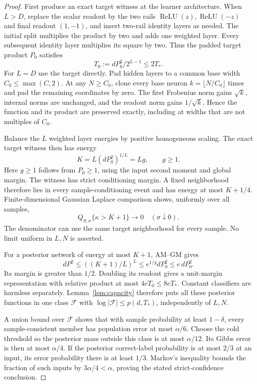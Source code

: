 \documentclass[11pt]{article}
\theoremstyle{remark}\newtheorem{remark}[theorem]{Remark}
\newcommand{\relu}{\operatorname{ReLU}}
\begin{document}
\begin{proof}
First produce an exact target witness at the learner architecture.
When $L>D$, replace the scalar readout by the two rails
$\relu(z),\relu(-z)$ and final readout $(1,-1)$, and insert two-rail
identity layers as needed. The initial split multiplies the product by
two and adds one weighted layer. Every subsequent identity layer
multiplies its square by two. Thus the padded target product $P_0$
satisfies
\[
 T_0:=dP_0^2/2^{L-1}\le2T_*.
\]
For $L=D$ use the target directly. Pad hidden layers to a common base
width $C_0\le\max(C,2)$. At any $N\ge C_0$, clone every base neuron
$k=\lfloor N/C_0\rfloor$ times and pad the remaining coordinates by zero.
The first Frobenius norm gains $\sqrt k$, internal norms are unchanged,
and the readout norm gains $1/\sqrt k$. Hence the function and its product
are preserved exactly, including at widths that are not multiples of
$C_0$.

Balance the $L$ weighted layer energies by positive homogeneous scaling.
The exact target witness then has energy
\[
 K=L(dP_0^2)^{1/L}=L g,\qquad g\ge1.
\]
Here $g\ge1$ follows from $P_0\ge1$, using the input second moment and
global margin. The witness has strict conditioning margin. A fixed
neighborhood therefore lies in every sample-conditioning event and has
energy at most $K+1/4$. Finite-dimensional Gaussian Laplace comparison
shows, uniformly over all samples,
\[
 Q_{S,\sigma}\{\kappa>K+1\}\longrightarrow0
                  \quad(\sigma\downarrow0).
\]
The denominator can use the same target neighborhood for every sample.
No limit uniform in $L,N$ is asserted.

For a posterior network of energy at most $K+1$, AM--GM gives
\[
 dP^2\le((K+1)/L)^L\le e^{1/g}dP_0^2\le e\,dP_0^2.
\]
Its margin is greater than $1/2$. Doubling its readout gives a unit-margin
representation with relative product at most $4eT_0\le8eT_*$.
Constant classifiers are harmless separately. Lemma~\ref{lem:capacity}
therefore puts all these posterior functions in one class $\mathcal F$
with $\log|\mathcal F|\le p(d,T_*)$, independently of $L,N$.

A union bound over $\mathcal F$ shows that with sample probability at
least $1-\delta$, every sample-consistent member has population error at
most $\alpha/6$. Choose the cold threshold so the posterior mass outside
this class is at most $\alpha/12$. Its Gibbs error is then at most
$\alpha/4$. If the posterior correct-label probability is at most $2/3$
at an input, its error probability there is at least $1/3$.
Markov's inequality bounds the fraction of such inputs by
$3\alpha/4<\alpha$, proving the stated strict-confidence conclusion.
\end{proof}
\end{document}
